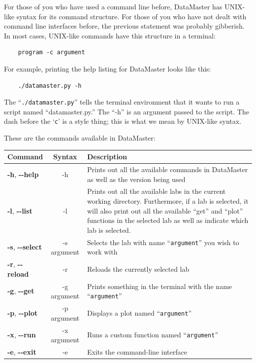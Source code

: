 \documentclass[12pt]{article}
\begin{document}
{For those of you who have used a command line before, DataMaster has UNIX-like syntax for its command structure. For those of you who have not dealt with command line interfaces before, the previous statement was probably gibberish. In most cases, UNIX-like commands have this structure in a terminal:
\begin{framed}
  \begin{lstlisting}
    program -c argument
  \end{lstlisting}
\end{framed}
For example, printing the help listing for DataMaster looks like this:
\begin{framed}
  \begin{lstlisting}
    ./datamaster.py -h
  \end{lstlisting}
\end{framed}
The ``\texttt{./datamaster.py}'' tells the terminal environment that it wants to run a script named ``datamaster.py.'' The ``-h'' is an argument passed to the script. The dash before the `\texttt{c}' is a style thing; this is what we mean by UNIX-like syntax.

These are the commands available in DataMaster:
\begin{framed}
  \centering
  {
  \setlength{\tabcolsep}{14pt}
  \renewcommand{\arraystretch}{2.5}
    \begin{tabular}{l | c | m{}}
      Command & Syntax & Description\\\hline
      \textbf{-h}, \textbf{{-}-help} & -h & Prints out all the available commands in DataMaster as well as the version being used \\
      \textbf{-l}, \textbf{{-}-list} & -l & Prints out all the available labs in the current working directory. Furthermore, if a lab is selected, it will also print out all the available ``get'' and ``plot'' functions in the selected lab as well as indicate which lab is selected.\\
      \textbf{-s}, \textbf{{-}-select} & -s argument & Selects the lab with name ``\texttt{argument}'' you wish to work with \\
      \textbf{-r}, \textbf{{-}-reload} & -r & Reloads the currently selected lab \\
      \textbf{-g}, \textbf{{-}-get} & -g argument & Prints something in the terminal with the name ``\texttt{argument}'' \\
      \textbf{-p}, \textbf{{-}-plot} & -p argument & Displays a plot named ``\texttt{argument}''\\
      \textbf{-x}, \textbf{{-}-run} & -x argument & Runs a custom function named ``\texttt{argument}'' \\
      \textbf{-e}, \textbf{{-}-exit} & -e & Exits the command-line interface \\
    \end{tabular}
  }
\end{framed}

}
\end{document}
